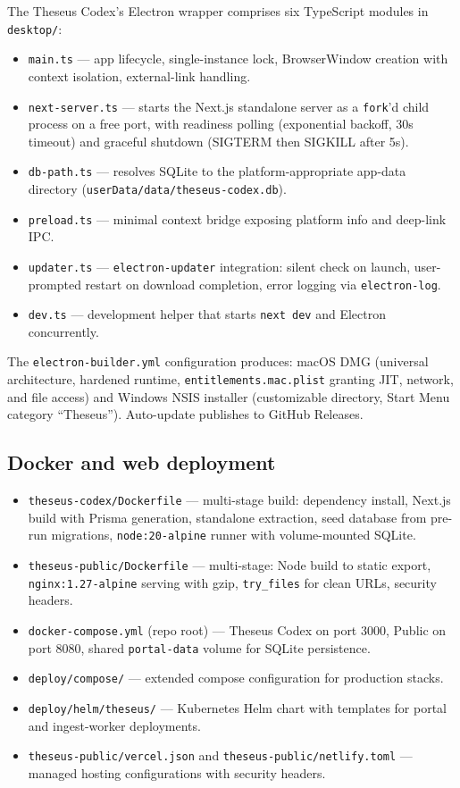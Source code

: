 \documentclass[11pt,letterpaper]{article}
\newcommand{\file}[1]{\texttt{#1}}
\begin{document}
The Theseus Codex's Electron wrapper comprises six TypeScript modules in \file{desktop/}:

\begin{itemize}[leftmargin=1.5em,itemsep=0.1em]
  \item \file{main.ts} --- app lifecycle, single-instance lock, BrowserWindow creation with context isolation, external-link handling.
  \item \file{next-server.ts} --- starts the Next.js standalone server as a \texttt{fork}'d child process on a free port, with readiness polling (exponential backoff, 30s timeout) and graceful shutdown (SIGTERM then SIGKILL after 5s).
  \item \file{db-path.ts} --- resolves SQLite to the platform-appropriate app-data directory (\file{userData/data/theseus-codex.db}).
  \item \file{preload.ts} --- minimal context bridge exposing platform info and deep-link IPC.
  \item \file{updater.ts} --- \texttt{electron-updater} integration: silent check on launch, user-prompted restart on download completion, error logging via \texttt{electron-log}.
  \item \file{dev.ts} --- development helper that starts \texttt{next dev} and Electron concurrently.
\end{itemize}

The \file{electron-builder.yml} configuration produces: macOS DMG (universal architecture, hardened runtime, \texttt{entitlements.mac.plist} granting JIT, network, and file access) and Windows NSIS installer (customizable directory, Start Menu category ``Theseus''). Auto-update publishes to GitHub Releases.

\subsection{Docker and web deployment}

\begin{itemize}[leftmargin=1.5em,itemsep=0.1em]
  \item \file{theseus-codex/Dockerfile} --- multi-stage build: dependency install, Next.js build with Prisma generation, standalone extraction, seed database from pre-run migrations, \texttt{node:20-alpine} runner with volume-mounted SQLite.
  \item \file{theseus-public/Dockerfile} --- multi-stage: Node build to static export, \texttt{nginx:1.27-alpine} serving with gzip, \texttt{try\_files} for clean URLs, security headers.
  \item \file{docker-compose.yml} (repo root) --- Theseus Codex on port 3000, Public on port 8080, shared \texttt{portal-data} volume for SQLite persistence.
  \item \file{deploy/compose/} --- extended compose configuration for production stacks.
  \item \file{deploy/helm/theseus/} --- Kubernetes Helm chart with templates for portal and ingest-worker deployments.
  \item \file{theseus-public/vercel.json} and \file{theseus-public/netlify.toml} --- managed hosting configurations with security headers.
\end{itemize}
\end{document}
